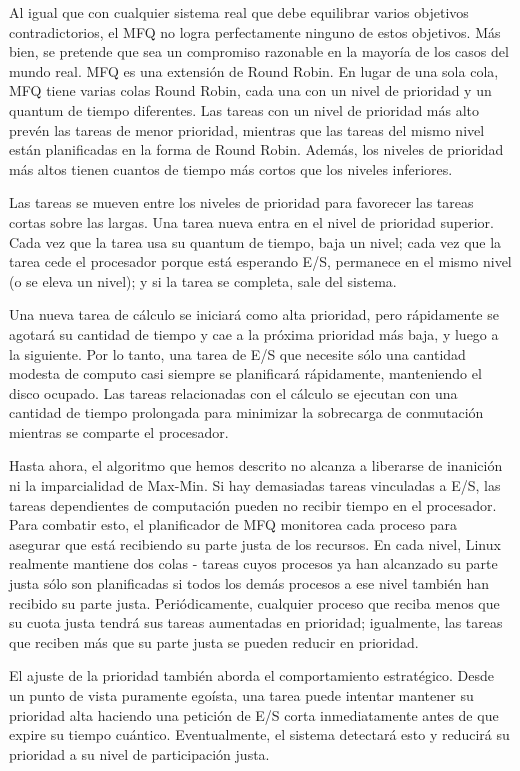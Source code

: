 \documentclass[10pt]{book}
\begin{document}
Al igual que con cualquier sistema real que debe equilibrar varios objetivos contradictorios, el MFQ no logra perfectamente ninguno de estos objetivos. Más bien, se pretende que sea un compromiso razonable en la mayoría de los casos del mundo real. MFQ es una extensión de Round Robin. En lugar de una sola cola, MFQ tiene varias colas Round Robin, cada una con un nivel de prioridad y un quantum de tiempo diferentes. Las tareas con un nivel de prioridad más alto prevén las tareas de menor prioridad, mientras que las tareas del mismo nivel están planificadas en la forma de Round Robin. Además, los niveles de prioridad más altos tienen cuantos de tiempo más cortos que los niveles inferiores.

Las tareas se mueven entre los niveles de prioridad para favorecer las tareas cortas sobre las largas. Una tarea nueva entra en el nivel de prioridad superior. Cada vez que la tarea usa su quantum de tiempo, baja un nivel; cada vez que la tarea cede el procesador porque está esperando E/S, permanece en el mismo nivel (o se eleva un nivel); y si la tarea se completa, sale del sistema.

Una nueva tarea de cálculo se iniciará como alta prioridad, pero rápidamente se agotará su cantidad de tiempo y cae a la próxima prioridad más baja, y luego a la siguiente. Por lo tanto, una tarea de E/S que necesite sólo una cantidad modesta de computo casi siempre se planificará rápidamente, manteniendo el disco ocupado. Las tareas relacionadas con el cálculo se ejecutan con una cantidad de tiempo prolongada para minimizar la sobrecarga de conmutación mientras se comparte el procesador.

Hasta ahora, el algoritmo que hemos descrito no alcanza a liberarse de inanición ni la imparcialidad de Max-Min. Si hay demasiadas tareas vinculadas a E/S, las tareas dependientes de computación pueden no recibir tiempo en el procesador. Para combatir esto, el planificador de MFQ monitorea cada proceso para asegurar que está recibiendo su parte justa de los recursos. En cada nivel, Linux realmente mantiene dos colas - tareas cuyos procesos ya han alcanzado su parte justa sólo son planificadas si todos los demás procesos a ese nivel también han recibido su parte justa. Periódicamente, cualquier proceso que reciba menos que su cuota justa tendrá sus tareas aumentadas en prioridad; igualmente, las tareas que reciben más que su parte justa se pueden reducir en prioridad.

El ajuste de la prioridad también aborda el comportamiento estratégico. Desde un punto de vista puramente egoísta, una tarea puede intentar mantener su prioridad alta haciendo una petición de E/S corta inmediatamente antes de que expire su tiempo cuántico. Eventualmente, el sistema detectará esto y reducirá su prioridad a su nivel de participación justa.
\end{document}
